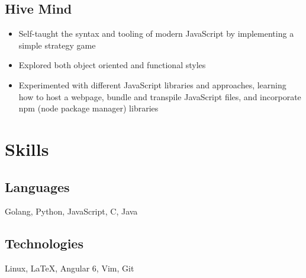 \documentclass[11pt]{article}
\begin{document}
\subsection{Hive Mind}
\begin{itemize}
	\item Self-taught the syntax and tooling of modern JavaScript by implementing a simple strategy game 
	\item Explored both object oriented and functional styles 
	\item Experimented with different JavaScript libraries and approaches, learning how to host a webpage, bundle and transpile JavaScript files, and incorporate npm (node package manager) libraries  
\end{itemize}



\section{Skills}
\begin{minipage}{20em}
	\subsection{Languages}
		Golang, Python, JavaScript, C, Java
\end{minipage}
\begin{minipage}{25em}
	\subsection{Technologies}
	Linux, \LaTeX , Angular 6, Vim, Git 	
\end{minipage}
\end{document}
